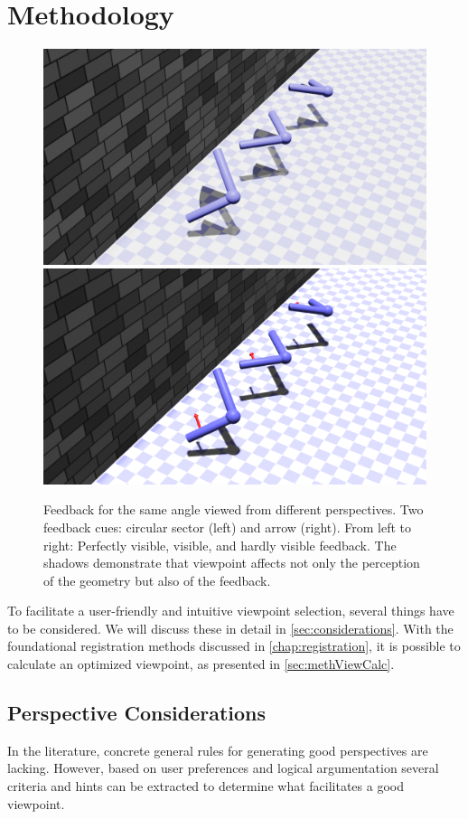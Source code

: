 \section{Methodology \label{sec:view:methodology}}
\begin{figure}[h!]
	\centering
	\includegraphics[width=0.49\linewidth]{pictures/projection_feedback}\hfill
	\includegraphics[width=0.49\linewidth]{pictures/projection_feedback_arrow}
	\caption[Feedback for the same angle viewed from different perspectives.]{Feedback for the same angle viewed from different perspectives. Two feedback cues: circular sector (left) and arrow (right). From left to right: Perfectly visible, visible, and hardly visible feedback. The shadows demonstrate that viewpoint affects not only the perception of the geometry but also of the feedback.}
	\label{fig:projection_feedback}
\end{figure}
To facilitate a user-friendly and intuitive viewpoint selection, several things have to be considered. We will discuss these in detail in \autoref{sec:considerations}. With the foundational registration methods discussed in \autoref{chap:registration}, it is possible to calculate an optimized viewpoint, as presented in \autoref{sec:methViewCalc}.

\subsection{Perspective Considerations \label{sec:considerations}}
In the literature, concrete general rules for generating good perspectives are lacking. However, based on user preferences and logical argumentation several criteria and hints can be extracted to determine what facilitates a good viewpoint.

